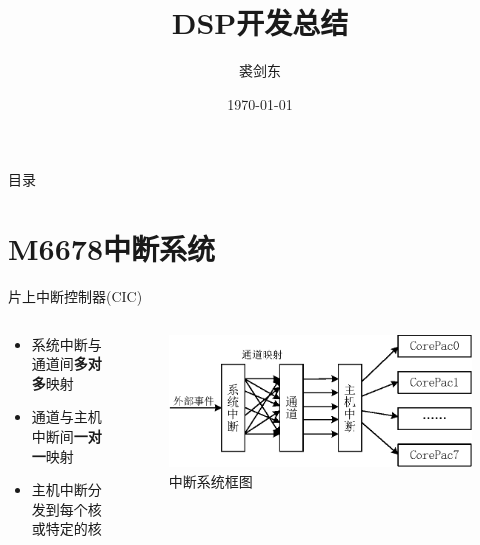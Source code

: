 \documentclass[10pt]{ctexbeamer}
\title{DSP开发总结}
\author{裘剑东}
\institute[HUST]{华中科技大学}
\date{\today}
\begin{document}
\begin{frame}
    \titlepage
\end{frame}

\begin{frame}{目录}
    \tableofcontents
\end{frame}


\section{M6678中断系统}

    \begin{frame}{片上中断控制器(CIC)}
        \begin{columns}
        \begin{column}[]{0.3\textwidth}
            \begin{itemize}
                \setlength{\itemsep}{0.5cm}
                \item 系统中断与通道间\textbf{多对多}映射
                \item 通道与主机中断间\textbf{一对一}映射
                \item 主机中断分发到每个核或特定的核
            \end{itemize}
        \end{column}
        \begin{column}{0.7\textwidth}
            \begin{figure}
            \centering
                \includegraphics[width=\textwidth]{summary/1.eps}
                \caption{中断系统框图}
            \end{figure}
        \end{column}
        \end{columns}
    \end{frame}
\end{document}
